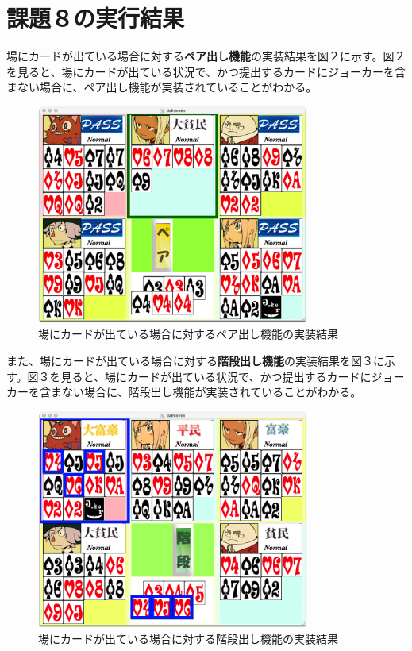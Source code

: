 \documentclass[]{jsarticle}
\begin{document}
\section*{課題８の実行結果}
場にカードが出ている場合に対する\textbf{ペア出し機能}の実装結果を図２に示す。図２を見ると、場にカードが出ている状況で、かつ提出するカードにジョーカーを含まない場合に、ペア出し機能が実装されていることがわかる。\\
\begin{figure}[h]
  \centering
  \includegraphics[width=0.8\textwidth]{./kadai8pair.jpg}
  \caption{場にカードが出ている場合に対するペア出し機能の実装結果}
\end{figure}
\newpage
また、場にカードが出ている場合に対する\textbf{階段出し機能}の実装結果を図３に示す。図３を見ると、場にカードが出ている状況で、かつ提出するカードにジョーカーを含まない場合に、階段出し機能が実装されていることがわかる。\\
\begin{figure}[h]
  \centering
  \includegraphics[width=0.8\textwidth]{./kadai8kaidan2.jpg}
  \caption{場にカードが出ている場合に対する階段出し機能の実装結果}
\end{figure}
\end{document}
